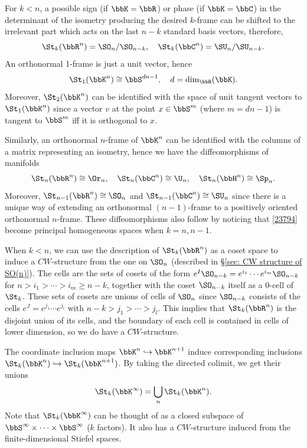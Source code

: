 \begin{rem}
    For $k<n$, a possible sign (if $\bbK=\bbR$) or phase (if $\bbK=\bbC$) in the determinant of the isometry producing the desired $k$-frame can be shifted to the irrelevant part which acts on the last $n-k$ standard basis vectors, therefore,
    \[\St_k(\bbR^n)=\SO_n\slash \SO_{n-k},\quad \St_k(\bbC^n)=\SU_n\slash \SU_{n-k}.\label{23794}\]
    An orthonormal 1-frame is just a unit vector, hence
    \[\St_1(\bbK^n)\cong \bbS^{dn-1},\quad d=\dim_\bbR(\bbK).\]
    Moreover, $\St_2(\bbK^n)$ can be identified with the space of unit tangent vectors to $\St_1(\bbK^n)$  since a vector $v$ at the point $x\in \bbS^m$ (where $m=dn-1$) is tangent to $\bbS^m$ iff it is orthogonal to $x$.
    
    Similarly, an orthonormal $n$-frame of $\bbK^n$ can be identified with the columns of a matrix representing an isometry, hence we have the diffeomorphisms of manifolds
    \[\St_n(\bbR^n)\cong \Or_n,\quad \St_n(\bbC^n)\cong\U_n, \quad \St_n(\bbH^n)\cong\Sp_n.\]
    Moreover, $\St_{n-1}(\bbR^n)\cong \SO_n$ and $\St_{n-1}(\bbC^n)\cong \SU_n$ since there is a unique way of extending an orthonormal $(n-1)$-frame to a positively oriented orthonormal $n$-frame. These diffeomorphisms also follow by noticing that \eqref{23794} become principal homogeneous spaces when $k=n,n-1$.
\end{rem}


When $k<n$, we can use the description of $\St_k(\bbR^n)$ as a coset space to induce a $CW$-structure from the one on $\SO_n$ (described in \S\ref{sec: CW structure of SO(n)}). The cells are the sets of cosets of the form $e^I\SO_{n-k}=e^{i_1}\cdots e^{i_m}\SO_{n-k}$ for $n>i_1>\cdots >i_m\geq n-k$, together with the coset $\SO_{n-k}$ itself as a $0$-cell of $\St_k$. These sets of cosets are unions of cells of $\SO_n$ since $\SO_{n-k}$ consists of the cells $e^J=e^{j_1}\cdots e^{j_l}$ with $n-k>j_1>\cdots >j_l$. This implies that $\St_k(\bbR^n)$ is the disjoint union of its cells, and the boundary of each cell is contained in cells of lower dimension, so we do have a $CW$-structure.


\begin{defn}
    The coordinate inclusion maps $\bbK^n\hookrightarrow \bbK^{n+1}$ induce corresponding inclusions $\St_k(\bbK^n)\hookrightarrow \St_k(\bbK^{n+1})$. By taking the directed colimit, we get their unions
    \[\St_k(\bbK^\infty)=\bigcup_n \St_k(\bbK^n).\]
    Note that $\St_k(\bbK^\infty)$ can be thought of as a closed subspace of $\bbS^\infty\times\cdots\times \bbS^\infty$ ($k$ factors). It also has a $CW$-structure induced from the finite-dimensional Stiefel spaces.
\end{defn}





